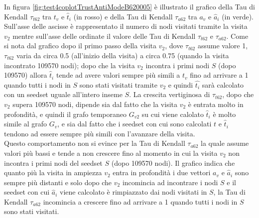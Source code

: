 In figura \ref{fig:test4coplotTrustAntiModeB620005} è illustrato il grafico della Tau di Kendall \(\tau_{t62}\) tra \(t_v\) e \(\hat{t}_i\) (in rosso)  e della Tau di Kendall \(\tau_{a62}\) tra \(a_v\) e \(\hat{a}_i\) (in verde). Sull'asse delle ascisse è rappresentato il numero di nodi visitati tramite la visita \(v_2\) mentre sull'asse delle ordinate il valore delle Tau di Kendall \(\tau_{t62}\) e \(\tau_{a62}\). Come si nota dal grafico dopo il primo passo della visita \(v_2\), dove \(\tau_{t62}\) assume valore 1, \(\tau_{t62}\) varia da circa 0.5 (all'inizio della visita) a circa 0.75 (quando la visita incontrato 109570 nodi);  dopo che la visita \(v_2\) incontra i primi nodi  \(S\) (dopo 109570) allora \(\hat{t}_i\) tende ad avere valori sempre più simili a \(t_v\) fino ad arrivare a 1 quando tutti i nodi in \(S\) sono stati visitati tramite \(v_2\) e quindi  \(\hat{t_i}\) sarà calcolato con un seedset uguale all'intero inseme \(S\). La crescita vertiginosa di \(\tau_{t62}\), dopo che \(v_2\) supera 109570 nodi, dipende sia dal fatto che la visita \(v_2\) è entrata molto in profondità, e quindi il grafo temporaneo \(G_{v2}\) su cui viene calolato \(\hat{t}_i\) è molto simile al grafo \(G_v\), e sia dal fatto che i seedset con cui sono calcolati \(t\) e \(\hat{t}_i\) tendono ad essere sempre più simili con l'avanzare della visita.\\ 
Questo comportamento non si evince per la Tau di Kendall \(\tau_{a62}\) la quale assume valori più bassi  e tende a non crescere fino al momento in cui la visita \(v_2\) non incontra i primi nodi del seedset \(S\) (dopo 109570 nodi). Il grafico indica che quanto più la visita in ampiezza \(v_2\) entra in profondità i due vettori \(a_v\) e \(\hat{a}_i\) sono sempre più distanti e solo dopo che \(v_2\) incomincia ad incontrare i nodi \(S\) e il seedset con cui \(\hat{a}_i\) viene calcolato è rimpiazzato dai nodi visitati in \(S\), la Tau di Kendall \(\tau_{a62}\) incomincia a crescere fino ad arrivare a 1 quando tutti i nodi  in \(S\) sono stati visitati.
